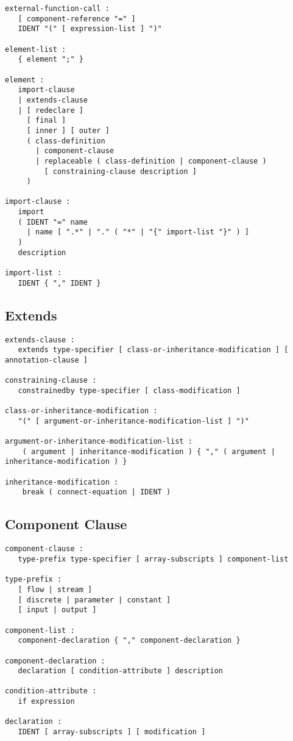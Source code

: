 \begin{lstlisting}[language=grammar]
external-function-call :
   [ component-reference "=" ]
   IDENT "(" [ expression-list ] ")"

element-list :
   { element ";" }

element :
   import-clause
   | extends-clause
   | [ redeclare ]
     [ final ]
     [ inner ] [ outer ]
     ( class-definition
       | component-clause
       | replaceable ( class-definition | component-clause )
         [ constraining-clause description ]
     )

import-clause :
   import
   ( IDENT "=" name
     | name [ ".*" | "." ( "*" | "{" import-list "}" ) ]
   )
   description

import-list :
   IDENT { "," IDENT }
\end{lstlisting}

\subsection{Extends}\label{extends}

\begin{lstlisting}[language=grammar]
extends-clause :
   extends type-specifier [ class-or-inheritance-modification ] [ annotation-clause ]

constraining-clause :
   constrainedby type-specifier [ class-modification ]

class-or-inheritance-modification :
   "(" [ argument-or-inheritance-modification-list ] ")"

argument-or-inheritance-modification-list :
    ( argument | inheritance-modification ) { "," ( argument | inheritance-modification ) }

inheritance-modification :
    break ( connect-equation | IDENT )
\end{lstlisting}

\subsection{Component Clause}\label{component-clause}

\begin{lstlisting}[language=grammar]
component-clause :
   type-prefix type-specifier [ array-subscripts ] component-list

type-prefix :
   [ flow | stream ]
   [ discrete | parameter | constant ]
   [ input | output ]

component-list :
   component-declaration { "," component-declaration }

component-declaration :
   declaration [ condition-attribute ] description

condition-attribute :
   if expression

declaration :
   IDENT [ array-subscripts ] [ modification ]
\end{lstlisting}

